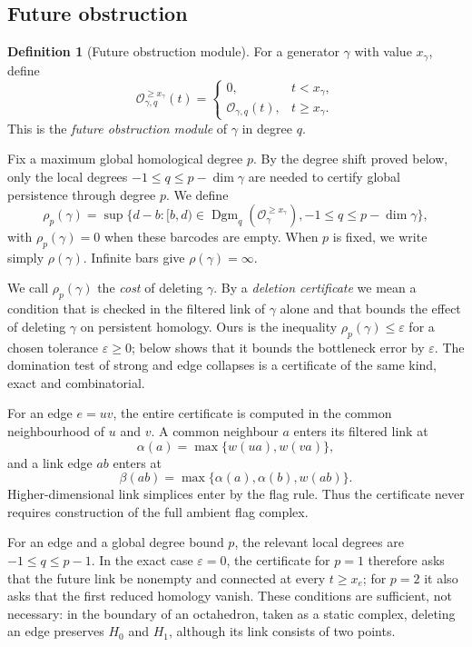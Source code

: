 \documentclass[11pt,letterpaper]{article}
\theoremstyle{definition}
\newtheorem{definition}[theorem]{Definition}
\newcommand{\Dgm}{\operatorname{Dgm}}
\newcommand{\Oc}{\mathcal O}
\newcommand{\eps}{\varepsilon}
\begin{document}
\subsection{Future obstruction}

\begin{definition}[Future obstruction module]
\label{def:future-obstruction}
For a generator $\gamma$ with value $x_\gamma$, define
$$
\Oc_{\gamma,q}^{\geq x_\gamma}(t)
=
\begin{cases}
0, & t<x_\gamma,\\
\Oc_{\gamma,q}(t), & t\geq x_\gamma.
\end{cases}
$$
This is the \emph{future obstruction module} of $\gamma$ in degree $q$.
\end{definition}

Fix a maximum global homological degree $p$. By the degree shift proved below,
only the local degrees $-1\leq q\leq p-\dim\gamma$ are needed to certify
global persistence through degree $p$. We define
$$
\rho_p(\gamma)
=\sup\{d-b:[b,d)\in
\Dgm_q(\Oc_\gamma^{\geq x_\gamma}),
-1\leq q\leq p-\dim\gamma\},
$$
with $\rho_p(\gamma)=0$ when these barcodes are empty. When $p$ is fixed, we
write simply $\rho(\gamma)$. Infinite bars give $\rho(\gamma)=\infty$.

We call $\rho_p(\gamma)$ the \emph{cost} of deleting $\gamma$. By a
\emph{deletion certificate} we mean a condition that is checked in the filtered
link of $\gamma$ alone and that bounds the effect of deleting $\gamma$ on
persistent homology. Ours is the inequality $\rho_p(\gamma)\leq\eps$ for a
chosen tolerance $\eps\geq0$;  below shows that it bounds
the bottleneck error by $\eps$. The domination test of strong and edge
collapses is a certificate of the same kind, exact and combinatorial.

For an edge $e=uv$, the entire certificate is computed in the common
neighbourhood of $u$ and $v$. A common neighbour $a$ enters its filtered link
at
$$
\alpha(a)=\max\{w(ua),w(va)\},
$$
and a link edge $ab$ enters at
$$
\beta(ab)=\max\{\alpha(a),\alpha(b),w(ab)\}.
$$
Higher-dimensional link simplices enter by the flag rule. Thus the certificate
never requires construction of the full ambient flag complex.

For an edge and a global degree bound $p$, the relevant local degrees are
$-1\leq q\leq p-1$. In the exact case $\eps=0$, the certificate for $p=1$
therefore asks that the future link be nonempty and connected at every
$t\geq x_e$; for $p=2$ it also asks that the first reduced homology vanish.
These conditions are sufficient, not necessary: in the boundary of an
octahedron, taken as a static complex, deleting an edge preserves $H_0$ and
$H_1$, although its link consists of two points.
\end{document}
